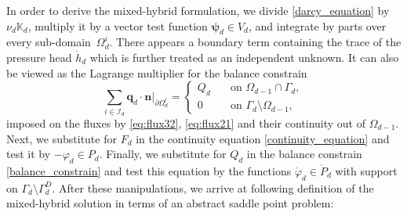 \documentclass[times]{nlaauth}%
\def\vc#1{\mathbf{\boldsymbol{#1}}}     %
\def\tn#1{{\mathbb{#1}}}    %
\def\prtl{\partial}                                        %
\def\phi{\varphi}
\begin{document}
In order to derive the mixed-hybrid formulation, we divide  \eqref{darcy_equation} by $\nu_d\tn K_d$, 
multiply it by a vector test function $\vc \psi_d \in V_d$,
and integrate by parts over every sub-domain~$\Omega_d^i$.
There appears a boundary term containing the trace of the pressure head $\mathring{h}_d$ which is further treated as an independent unknown. 
It can also be viewed as the Lagrange multiplier for the balance constrain
\begin{equation}
 \label{balance_constrain}
 \sum_{i\in \mathcal{I}_d} \vc q_d\cdot \vc n |_{\prtl\Omega_d^i} = \left\{ 
    \begin{array}{ll}
      Q_{d}\quad  &\text{on } \Omega_{d-1}\cap \Gamma_d,\\
      0    \quad  &\text{on } \Gamma_d \setminus \Omega_{d-1}, 
    \end{array}
 \right.
\end{equation}
imposed on the fluxes by \eqref{eq:flux32}, \eqref{eq:flux21} and their continuity out of $\Omega_{d-1}$.
Next, we substitute for $F_d$  in the continuity equation \eqref{continuity_equation}
and test it by $-\phi_d \in P_d$. Finally, we  substitute for $Q_d$ in the balance constrain \eqref{balance_constrain} 
and test this equation by the functions $\mathring\phi_d \in \mathring P_d$
with support on $\Gamma_d \setminus \Gamma_d^D$. After these manipulations, we arrive at 
following definition of the mixed-hybrid solution in terms of an abstract saddle point problem:
\end{document}
